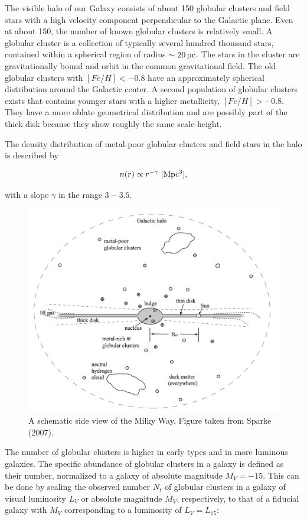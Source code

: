 \documentclass[a4paper,11pt]{article}
\begin{document}
{\noindent}The visible halo of our Galaxy consists of about 150 globular clusters and field stars with a high velocity component perpendicular to the Galactic plane. Even at about 150, the number of known globular clusters is relatively small. A globular cluster is a collection of typically several hundred thousand stars, contained within a spherical region of radius   $\sim20\,{\rm pc}$. The stars in the cluster are gravitationally bound and orbit in the common gravitational field. The old globular clusters with $[Fe/H]<-0.8$ have an approximately spherical distribution around the Galactic center. A second population of globular clusters exists that contains younger stars with a higher metallicity, $[Fe/H]>-0.8$. They have a more oblate geometrical distribution and are possibly part of the thick disk because they show roughly the same scale-height.

{\noindent}The density distribution of metal-poor globular clusters and field stars in the halo is described by

\begin{align*}
    n(r)\propto r^{-\gamma} ~ [{\rm Mpc^3}],
\end{align*}

{\noindent}with a slope $\gamma$ in the range $3-3.5$.

\begin{figure}[t!]
    \includegraphics[width=12cm]{figures/MWGschematic.png}
    \centering
    \caption{A schematic side view of the Milky Way. Figure taken from Sparke (2007).}
    \label{fig:mwgschematic}
\end{figure}

{\noindent}The number of globular clusters is higher in early types and in more luminous galaxies. The specific abundance of globular clusters in a galaxy is defined as their number, normalized to a galaxy of absolute magnitude $M_V=-15$. This can be done by scaling the observed number $N_t$ of globular clusters in a galaxy of visual luminosity $L_V$ or absolute magnitude $M_V$, respectively, to that of a fiducial galaxy with $M_V$ corresponding to a luminosity of $L_V=L_{15}$:
\end{document}
